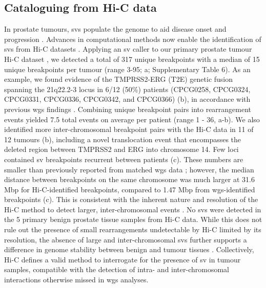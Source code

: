 \subsection{Cataloguing  from Hi-C data}

In prostate tumours, \glspl{sv} populate the genome to aid disease onset and progression \cite{fraserGenomicHallmarksLocalized2017,quigleyGenomicHallmarksStructural2018}.
Advances in computational methods now enable the identification of \glspl{sv} from Hi-C datasets \cite{dixonIntegrativeDetectionAnalysis2018,hoStructuralVariationSequencing2020}.
Applying an \gls{sv} caller to our primary prostate tumour Hi-C dataset \cite{dixonIntegrativeDetectionAnalysis2018}, we detected a total of 317 unique breakpoints with a median of 15 unique breakpoints per tumour (range 3-95; a; Supplementary Table 6).
As an example, we found evidence of the TMPRSS2-ERG (T2E) genetic fusion spanning the 21q22.2-3 locus in 6/12 (50\%) patients (CPCG0258, CPCG0324, CPCG0331, CPCG0336, CPCG0342, and CPCG0366) (b), in accordance with previous \gls{wgs} findings \cite{fraserGenomicHallmarksLocalized2017}.
Combining unique breakpoint pairs into rearrangement events yielded 7.5 total events on average per patient (range 1 - 36, a-b).
We also identified more inter-chromosomal breakpoint pairs with the Hi-C data in 11 of 12 tumours (b), including a novel translocation event that encompasses the deleted region between TMPRSS2 and ERG into chromosome 14.
Few loci contained \gls{sv} breakpoints recurrent between patients (c).
These numbers are smaller than previously reported from matched \gls{wgs} data \cite{fraserGenomicHallmarksLocalized2017}; however, the median distance between breakpoints on the same chromosome was much larger at 31.6 Mbp for Hi-C-identified breakpoints, compared to 1.47 Mbp from \gls{wgs}-identified breakpoints (c).
This is consistent with the inherent nature and resolution of the Hi-C method to detect larger, inter-chromosomal events \cite{dixonIntegrativeDetectionAnalysis2018}.
No \glspl{sv} were detected in the 5 primary benign prostate tissue samples from Hi-C data.
While this does not rule out the presence of small rearrangements undetectable by Hi-C limited by its resolution, the absence of large and inter-chromosomal \glspl{sv} further supports a difference in genome stability between benign and tumour tissues \cite{fraserGenomicHallmarksLocalized2017,bergerGenomicComplexityPrimary2011,bacaPunctuatedEvolutionProstate2013,mazrooeiCistromePartitioningReveals2019}.
Collectively, Hi-C defines a valid method to interrogate for the presence of \gls{sv} in tumour samples, compatible with the detection of intra- and inter-chromosomal interactions otherwise missed in \gls{wgs} analyses.

